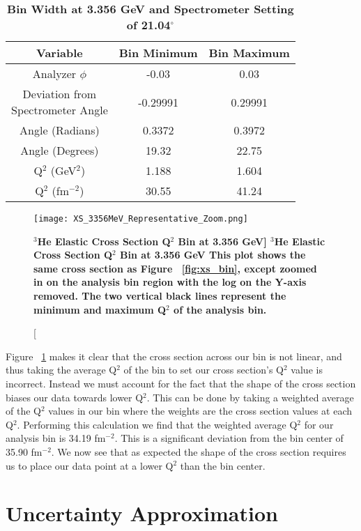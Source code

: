 \begin{table}[!h]
\centering
\begin{tabular}{|c | c c |}
\hline
\textbf{Variable} & \textbf{Bin Minimum} & \textbf{Bin Maximum}\\
\hline
Analyzer $\phi$ & -0.03 & 0.03\\ 
\makecell{Deviation from \\ Spectrometer Angle} & -0.29991 & 0.29991\\
Angle (Radians) & 0.3372 &  0.3972\\
Angle (Degrees) & 19.32 & 22.75\\
Q$^2$ (GeV$^2$) & 1.188 & 1.604\\
Q$^2$ (fm$^{-2}$) & 30.55 & 41.24\\
\hline
\end{tabular}
\caption{{\bf{Bin Width at 3.356 GeV and Spectrometer Setting of 21.04$^\circ$}} }
\label{tab:bin}
\end{table}

\begin{figure}[!ht]
\begin{center}
\texttt{[image: XS\_3356MeV\_Representative\_Zoom.png]}
\end{center}
\caption[\bf{$^3$He Elastic Cross Section Q$^2$ Bin at 3.356 GeV}]{
{\bf{$^3$He Elastic Cross Section Q$^2$ Bin at 3.356 GeV}} This plot shows the same cross section as Figure ~\ref{fig:xs_bin}, except zoomed in on the analysis bin region with the log on the Y-axis removed. The two vertical black lines represent the minimum and maximum Q$^2$ of the analysis bin.}
\label{fig:xs_bin_zoom}
\end{figure}

Figure ~\ref{fig:xs_bin_zoom} makes it clear that the cross section across our bin is not linear, and thus taking the average Q$^2$ of the bin to set our cross section's Q$^2$ value is incorrect. Instead we must account for the fact that the shape of the cross section biases our data towards lower Q$^2$. This can be done by taking a weighted average of the Q$^2$ values in our bin where the weights are the cross section values at each Q$^2$. Performing this calculation we find that the weighted average Q$^2$ for our analysis bin is 34.19 fm$^{-2}$. This is a significant deviation from the bin center of 35.90 fm$^{-2}$. We now see that as expected the shape of the cross section requires us to place our data point at a lower Q$^2$ than the bin center.

\section{Uncertainty Approximation}
\label{sec:uncertainty}


